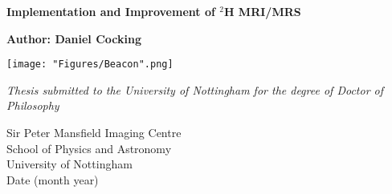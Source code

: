 \documentclass[12pt,english]{report}
\begin{document}
 

\begin{titlepage}
   \begin{center}
 
       \textbf{\huge{Implementation and Improvement of $^2$H MRI/MRS}}
 
       \vspace{1cm}
 
       \huge{\textbf{Author: Daniel Cocking} \\}
       
       \vspace{1.5cm}
       \texttt{[image: "Figures/Beacon".png]}
       \vspace{1.5cm}
       
       \Large{\emph{Thesis submitted to the University of Nottingham for the degree of Doctor of Philosophy}} 
 
 \vspace{2cm}
 
       Sir Peter Mansfield Imaging Centre \\
       School of Physics and Astronomy\\
       University of Nottingham\\
       Date (month year)
 
   \end{center}
\end{titlepage}

\mbox{}
\thispagestyle{empty}
\begin{abstract}
    \thispagestyle{plain}
    \setcounter{page}{1}
    \blindtext
\end{abstract}
\newpage
\mbox{}

\renewcommand{\abstractname}{Acknowledgements}
\begin{abstract}
    \thispagestyle{plain}
    \setcounter{page}{2}
    \blindtext
\end{abstract}
\newpage
\mbox{}

\setcounter{page}{3}
\tableofcontents

\pagestyle{fancy}
\fancyhf{}
\renewcommand{\headrulewidth}{1 pt}
\renewcommand{\headrule}{\hbox to\headwidth{\color{gray}\leaders\hrule height \headrulewidth\hfill}}
\end{document}
